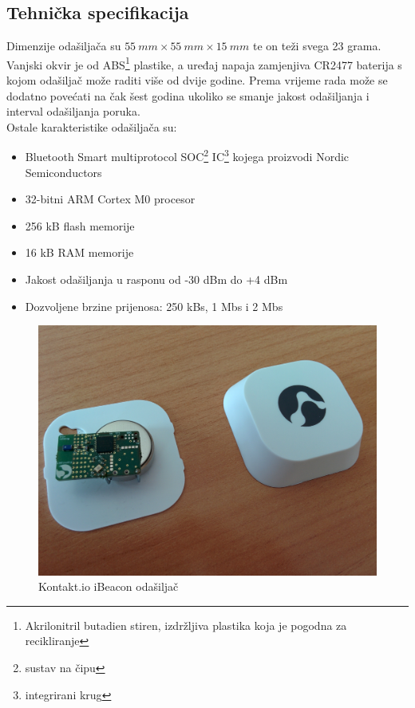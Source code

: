 \subsection*{Tehnička specifikacija}

Dimenzije odašiljača su $\SI{55}{mm} \times \SI{55}{mm} \times \SI{15}{mm}$ te on teži svega 23 grama. 
Vanjski okvir je od ABS\footnote{Akrilonitril butadien stiren, izdržljiva plastika koja je pogodna za recikliranje} plastike, a uređaj napaja zamjenjiva CR2477 baterija s kojom odašiljač može raditi više od dvije godine. 
Prema \citep{kontaktTehnical} vrijeme rada može se dodatno povećati na čak šest godina ukoliko se smanje jakost odašiljanja i interval odašiljanja poruka.
\\
Ostale karakteristike odašiljača su:
\begin{itemize}
    \item Bluetooth Smart multiprotocol SOC\footnote{sustav na čipu } IC\footnote{integrirani krug } kojega proizvodi Nordic Semiconductors
    \item 32-bitni ARM Cortex M0 procesor
    \item 256 kB flash memorije
    \item 16 kB RAM memorije
    \item Jakost odašiljanja u rasponu od -30 dBm do +4 dBm 
    \item Dozvoljene brzine prijenosa: 250 kBs, 1 Mbs i 2 Mbs
\end{itemize}

\begin{figure}[H]
    \centering
    \includegraphics[scale=0.1]{pictures/IMG_20140505_095855}
    \caption{Kontakt.io iBeacon odašiljač}
\end{figure}

